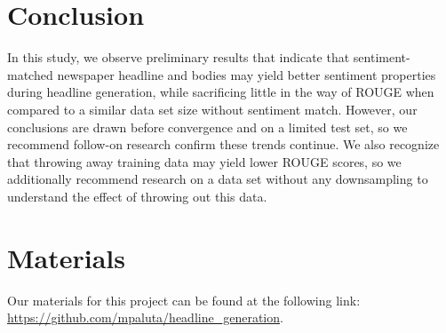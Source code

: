 \documentclass[11pt]{article}
\begin{document}
\section{Conclusion}
In this study, we observe preliminary results that indicate that sentiment-matched newspaper headline and bodies may yield better sentiment properties during headline generation, while sacrificing little in the way of ROUGE when compared to a similar data set size without sentiment match. However, our conclusions are drawn before convergence and on a limited test set, so we recommend follow-on research confirm these trends continue. We also recognize that throwing away training data may yield lower ROUGE scores, so we additionally recommend research on a data set without any downsampling to understand the effect of throwing out this data.

\section{Materials}
Our materials for this project can be found at the following link:
\url{https://github.com/mpaluta/headline_generation}.




\end{document}
